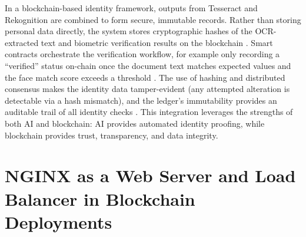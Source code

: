 \documentclass[a4paper,10pt]{report}
\begin{document}
In a blockchain-based identity framework, outputs from Tesseract and Rekognition are combined to form secure, immutable records. Rather than storing personal data directly, the system stores cryptographic hashes of the OCR-extracted text and biometric verification results on the blockchain \cite{atkar2025aiblockchain}. Smart contracts orchestrate the verification workflow, for example only recording a “verified” status on-chain once the document text matches expected values and the face match score exceeds a threshold \cite{atkar2025aiblockchain}. The use of hashing and distributed consensus makes the identity data tamper-evident (any attempted alteration is detectable via a hash mismatch), and the ledger’s immutability provides an auditable trail of all identity checks \cite{atkar2025aiblockchain}. This integration leverages the strengths of both AI and blockchain: AI provides automated identity proofing, while blockchain provides trust, transparency, and data integrity.

\section{NGINX as a Web Server and Load Balancer in Blockchain Deployments}

\end{document}
